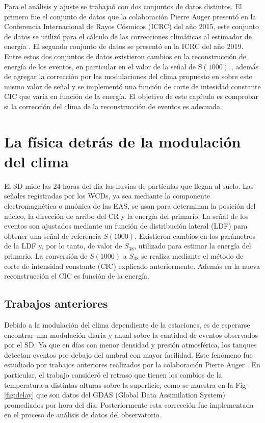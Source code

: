
Para el análisis y ajuste se trabajaó con dos conjuntos de datos distintos. El primero fue el conjunto de datos que la colaboración Pierre Auger presentó en la Conferencia Internacional de Rayos Cósmicos (ICRC) del año 2015, este conjunto de datos se utilizó para el cálculo de las correcciones climáticas al estimador de energía \cite{aab2017impact}. El segundo conjunto de datos se presentó en la ICRC del año 2019. Entre estos dos conjuntos de datos existieron cambios en la reconstrucción de energía de los eventos, en particular en el valor de la señal de S$(1000)$ \cite{isabel}, además de agregar la corrección por las modulaciones del clima propuesto en \cite{aab2017impact} sobre este mismo valor de señal y se implementó una función de corte de intesidad constante CIC que varía en función de la energía. El objetivo de este capítulo es comprobar si la corrección del clima de la reconstrucción de eventos es adecuada.

\section{La física detrás de la modulación del clima}\label{seccion:fisica_clima}

El SD mide las 24 horas del día las lluvias de partículas que llegan al suelo. Las señales registradas por los WCDs, ya sea mediante la componente electromagnética o muónica de las EAS, se usan para determinan la posición del núcleo, la dirección de arribo del CR y la energía del primario. La señal de los eventos son ajustados mediante un función de distribución lateral (LDF) para obtener una señal de referencia $S(1000)$. Existieron cambios en los parámetros de la LDF y, por lo tanto, de valor de $S_{38}$, utilizado para estimar la energía del primario. La conversión de $S(1000)$ a $S_{38}$ se realiza mediante el método de corte de intensidad constante (CIC) explicado anteriormente. Además en la nueva reconstrucción el CIC es función de la energía.

\subsection{Trabajos anteriores}

Debido a la modulación del clima dependiente de la estaciones, es de esperarse encontrar una modulación diaria y anual sobre la cantidad de eventos observados por el SD. Ya que en días con menor densidad y presión atmosférica, los tanques detectan eventos por debajo del umbral con mayor facilidad. Este fenómeno fue estudiado por trabajos anteriores realizados por la colaboración Pierre Auger \cite{aab2017impact} \cite{collaboration2009atmospheric}. En particular, el trabajo \cite{aab2017impact} consideró el retraso que tienen los cambios de  la temperatura a distintas alturas sobre la superficie, como se muestra en la Fig\,\ref{fig:delay} que son datos del GDAS (Global Data Assimilation System) promediados por hora del día. Posteriormente esta corrección fue implementada en el proceso  de análisis de datos del observatorio.


